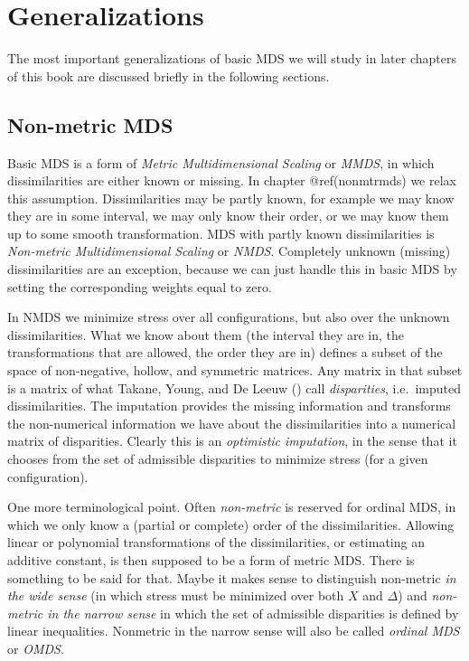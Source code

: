 \documentclass[
  12pt,
  letterpaper,
  DIV=11,
  numbers=noendperiod]{scrreprt}
\theoremstyle{remark}
\begin{document}
\section{Generalizations}\label{introgeneralize}

The most important generalizations of basic MDS we will study in later
chapters of this book are discussed briefly in the following sections.

\subsection{Non-metric MDS}\label{gennonmetric}

Basic MDS is a form of \emph{Metric Multidimensional Scaling} or
\emph{MMDS}, in which dissimilarities are either known or missing. In
chapter @ref(nonmtrmds) we relax this assumption. Dissimilarities may be
partly known, for example we may know they are in some interval, we may
only know their order, or we may know them up to some smooth
transformation. MDS with partly known dissimilarities is
\emph{Non-metric Multidimensional Scaling} or \emph{NMDS}. Completely
unknown (missing) dissimilarities are an exception, because we can just
handle this in basic MDS by setting the corresponding weights equal to
zero.

In NMDS we minimize stress over all configurations, but also over the
unknown dissimilarities. What we know about them (the interval they are
in, the transformations that are allowed, the order they are in) defines
a subset of the space of non-negative, hollow, and symmetric matrices.
Any matrix in that subset is a matrix of what Takane, Young, and De
Leeuw () call
\emph{disparities}, i.e.~imputed dissimilarities. The imputation
provides the missing information and transforms the non-numerical
information we have about the dissimilarities into a numerical matrix of
disparities. Clearly this is an \emph{optimistic imputation}, in the
sense that it chooses from the set of admissible disparities to minimize
stress (for a given configuration).

One more terminological point. Often \emph{non-metric} is reserved for
ordinal MDS, in which we only know a (partial or complete) order of the
dissimilarities. Allowing linear or polynomial transformations of the
dissimilarities, or estimating an additive constant, is then supposed to
be a form of metric MDS. There is something to be said for that. Maybe
it makes sense to distinguish non-metric \emph{in the wide sense} (in
which stress must be minimized over both \(X\) and \(\Delta\)) and
\emph{non-metric in the narrow sense} in which the set of admissible
disparities is defined by linear inequalities. Nonmetric in the narrow
sense will also be called \emph{ordinal MDS} or \emph{OMDS}.
\end{document}
